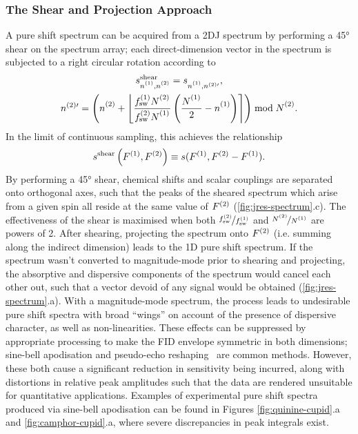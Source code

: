 \subsubsection{The Shear and Projection Approach}
A pure shift spectrum can be acquired from a \ac{2DJ} spectrum by performing a
\ang{45} shear on the spectrum array; each direct-dimension vector in the
spectrum is subjected to a right circular rotation according to
\begin{subequations}
    \begin{gather}
        s_{\none,\ntwo}^{\text{shear}} =
            s_{\none,n^{(2)\prime}}^{\vphantom{{\text{tilt}}}},\\
        n^{(2)\prime} = \left(\ntwo + \left\lfloor
                \frac
                    {\fswone \Ntwo\vpsub{\mathrm{sw}}}
                    {\fswtwo \None\vpsub{\mathrm{sw}}}
                \left(
                    \frac{\None\vpsub{\mathrm{sw}}}{2} - \none
                \right)
            \right\rceil
        \right) \bmod \Ntwo.
    \end{gather}
\end{subequations}
In the limit of continuous sampling, this achieves the relationship
\[
    s^{\text{shear}}\left(F^{(1)},F^{(2)}\right) \equiv s(F^{(1)}, F^{(2)} - F^{(1)}).
\]
By performing a \ang{45} shear, chemical shifts and scalar couplings are
separated onto orthogonal axes,
such that the peaks of the sheared spectrum which arise from a given spin all
reside at the same value of $F^{(2)}$ (\cref{fig:jres-spectrum}.c). The
effectiveness of the shear is maximised when both $\nicefrac{f_{\mathrm{sw}}^{(2)}}{f_{\mathrm{sw}}^{(1)}}$
and $\nicefrac{\Ntwo}{\None}$ are powers of 2. After shearing, projecting the
spectrum onto $F^{(2)}$ (i.e. summing along the indirect dimension) leads
to the \ac{1D} pure shift spectrum.
If the spectrum wasn't converted to magnitude-mode prior to shearing and
projecting, the absorptive and dispersive components of the spectrum would
cancel each other out, such that a vector devoid of any signal would be
obtained (\cref{fig:jres-spectrum}.a).
With a magnitude-mode spectrum, the process leads to undesirable pure shift
spectra with broad ``wings'' on account of the presence of dispersive
character, as well as non-linearities. These effects can be suppressed by
appropriate
processing to make the FID envelope symmetric in both dimensions;
sine-bell apodisation and pseudo-echo reshaping~\cite{Bax1981} are common methods.
However, these both cause a significant reduction in sensitivity being
incurred, along with distortions in relative peak amplitudes such that the data
are rendered unsuitable for quantitative applications. Examples of experimental
pure shift spectra produced via sine-bell apodisation can be found in Figures
\ref{fig:quinine-cupid}.a and \ref{fig:camphor-cupid}.a, where severe
discrepancies in peak integrals exist.

